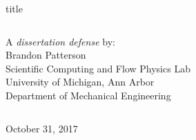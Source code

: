 \begin{frame} %
  \vspace*{1cm}

  {
  \begin{beamercolorbox}[sep=8pt,center,wd=\paperwidth,ht=0.3\textheight,dp=0.045\textheight]{title}
    \inserttitle\par%
  \end{beamercolorbox}
  }
  \centering
  \begin{columns}
    
    \begin{center}
      \normalsize{A \emph{dissertation defense} by:\\Brandon Patterson} \vspace{16pt} \\ 
      \footnotesize{Scientific Computing and Flow Physics Lab} \vspace{4pt}\\
      \footnotesize{University of Michigan, Ann Arbor} \vspace{4pt}\\
      \scriptsize{Department of Mechanical Engineering} \vspace{4pt}\\
    \end{center}
    \vspace*{.15cm}
  \end{columns}
  \vspace{.25cm}
  \begin{center}
    \footnotesize {October 31, 2017} \vspace{-.1cm}
  \end{center}




\end{frame}
